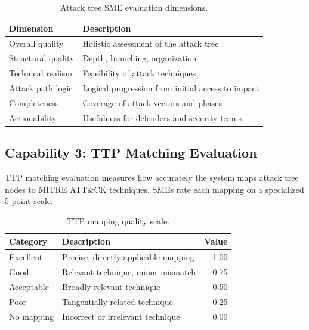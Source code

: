 \begin{table}[t]
\centering
\caption{Attack tree SME evaluation dimensions.}
\label{tab:tree-scores}
\begin{tabular}{@{}lp{7.5cm}@{}}
\toprule
\textbf{Dimension} & \textbf{Description} \\
\midrule
Overall quality & Holistic assessment of the attack tree \\
Structural quality & Depth, branching, organization \\
Technical realism & Feasibility of attack techniques \\
Attack path logic & Logical progression from initial access to impact \\
Completeness & Coverage of attack vectors and phases \\
Actionability & Usefulness for defenders and security teams \\
\bottomrule
\end{tabular}
\end{table}

\subsection{Capability 3: TTP Matching Evaluation}
\label{sec:ttp-eval}

TTP matching evaluation measures how accurately the system maps attack tree nodes to MITRE ATT\&CK techniques. SMEs rate each mapping on a specialized 5-point scale:

\begin{table}[t]
\centering
\caption{TTP mapping quality scale.}
\label{tab:ttp-scale}
\begin{tabular}{@{}llr@{}}
\toprule
\textbf{Category} & \textbf{Description} & \textbf{Value} \\
\midrule
Excellent & Precise, directly applicable mapping & 1.00 \\
Good & Relevant technique, minor mismatch & 0.75 \\
Acceptable & Broadly relevant technique & 0.50 \\
Poor & Tangentially related technique & 0.25 \\
No mapping & Incorrect or irrelevant technique & 0.00 \\
\bottomrule
\end{tabular}
\end{table}

